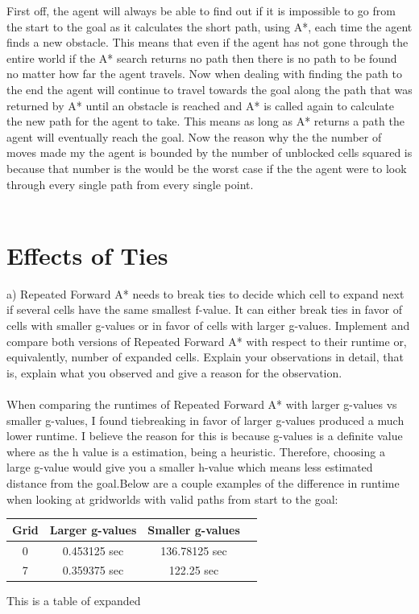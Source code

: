 \documentclass{article}
\begin{document}
First off, the agent will always be able to find out if it is impossible to go from the start to the goal as it calculates the short path, using A*, each time the agent finds a new obstacle. This means that even if the agent has not gone through the entire world if the A* search returns no path then there is no path to be found no matter how far the agent travels. Now when dealing with finding the path to the end the agent will continue to travel towards the goal along the path that was returned by A* until an obstacle is reached and A* is called again to calculate the new path for the agent to take. This means as long as A* returns a path the agent will eventually reach the goal. Now the reason why the the number of moves made my the agent is bounded by the number of unblocked cells squared is because that number is the would be the worst case if the the agent were to look through every single path from every single point.\\\\
\section{Effects of Ties}
a) Repeated Forward A* needs to break ties to decide which cell to expand next if several cells have the same smallest f-value. It can either break ties in favor of cells with smaller g-values or in favor of cells with larger g-values. Implement and compare both versions of Repeated Forward A* with respect to their runtime or, equivalently, number of expanded cells. Explain your observations in detail, that is, explain what you observed and give a reason for the observation.
\\\\When comparing the runtimes of Repeated Forward A* with larger g-values vs smaller g-values, I found tiebreaking in favor of larger g-values produced a much lower runtime. I believe the reason for this is because g-values is a definite value where as the h value is a estimation, being a heuristic. Therefore, choosing a large g-value would give you a smaller h-value which means less estimated distance from the goal.Below are a couple examples of the difference in runtime when looking at gridworlds with valid paths from start to the goal:
\begin{center}
\begin{tabular}{ |c|c|c|c| } 
\hline
Grid & Larger g-values & Smaller g-values \\
\hline
0 & 0.453125 sec & 136.78125 sec \\
7 & 0.359375 sec & 122.25 sec\\
\hline
\end{tabular}
\end{center}
This is a table of expanded
\end{document}
